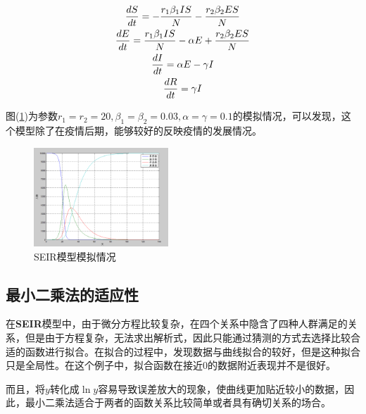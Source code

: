 \documentclass{article}
\begin{document}
\begin{multicols}{2}
                \begin{gather}
                    \frac{dS}{dt}=-\frac{r_1{\beta}_1IS}{N}-\frac{r_2{\beta}_2ES}{N} \notag \\
                    \frac{dE}{dt}=\frac{r_1{\beta}_1IS}{N}-{\alpha}E+\frac{r_2{\beta}_2ES}{N} \notag \\
                    \frac{dI}{dt}={\alpha}E-{\gamma}I \notag \\
                    \frac{dR}{dt}={\gamma}I
                \end{gather}

                图(\ref{plot9})为参数$r_1=r_2=20,{\beta}_1={\beta}_2=0.03,\alpha=\gamma=0.1$的模拟情况，可以发现，这个模型除了在疫情后期，能够较好的反映疫情的发展情况。

                \begin{figure}[H]
                    \centering
                    \includegraphics[width=0.45\textwidth]{plot9.png}
                    \caption{SEIR模型模拟情况}
                    \label{plot9}
                \end{figure}
            \subsection{最小二乘法的适应性}
                在\textbf{SEIR}模型中，由于微分方程比较复杂，在四个关系中隐含了四种人群满足的关系，但是由于方程复杂，无法求出解析式，因此只能通过猜测的方式去选择比较合适的函数进行拟合。在拟合的过程中，发现数据与曲线拟合的较好，但是这种拟合只是全局性。在这个例子中，拟合函数在接近$0$的数据附近表现并不是很好。

                而且，将$y$转化成$\ln{y}$容易导致误差放大的现象，使曲线更加贴近较小的数据，因此，最小二乘法适合于两者的函数关系比较简单或者具有确切关系的场合。

    \end{multicols}
    
\end{document}
